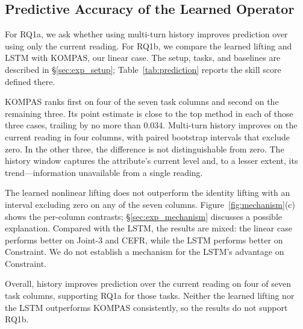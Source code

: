 \subsection{Predictive Accuracy of the Learned Operator}
\label{sec:exp_prediction}

For RQ1a, we ask whether using multi-turn history improves prediction over using only the current reading. For RQ1b, we compare the learned lifting and LSTM with KOMPAS, our linear case. The setup, tasks, and baselines are described in \S\ref{sec:exp_setup}; Table~\ref{tab:prediction} reports the skill score defined there.

KOMPAS ranks first on four of the seven task columns and second on the remaining three. Its point estimate is close to the top method in each of those three cases, trailing by no more than 0.034. Multi-turn history improves on the current reading in four columns, with paired bootstrap intervals that exclude zero. In the other three, the difference is not distinguishable from zero. The history window captures the attribute’s current level and, to a lesser extent, its trend—information unavailable from a single reading.

The learned nonlinear lifting does not outperform the identity lifting with an interval excluding zero on any of the seven columns. Figure~\ref{fig:mechanism}(c) shows the per-column contrasts; \S\ref{sec:exp_mechanism} discusses a possible explanation. Compared with the LSTM, the results are mixed: the linear case performs better on Joint-3 and CEFR, while the LSTM performs better on Constraint. We do not establish a mechanism for the LSTM’s advantage on Constraint.

Overall, history improves prediction over the current reading on four of seven task columns, supporting RQ1a for those tasks. Neither the learned lifting nor the LSTM outperforms KOMPAS consistently, so the results do not support RQ1b.

